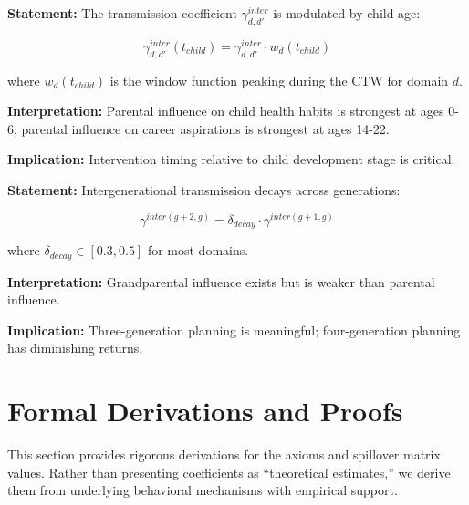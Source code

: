 \begin{tcolorbox}[colback=gray!5!white, colframe=gray!75!black,
    title=Axiom BI-3: Window Sensitivity]
\textbf{Statement:} The transmission coefficient $\gamma^{inter}_{d,d'}$ is modulated by child age:

\begin{equation}
\gamma^{inter}_{d,d'}(t_{child}) = \gamma^{inter}_{d,d'} \cdot w_d(t_{child})
\end{equation}

where $w_d(t_{child})$ is the window function peaking during the CTW for domain $d$.

\textbf{Interpretation:} Parental influence on child health habits is strongest at ages 0-6;
parental influence on career aspirations is strongest at ages 14-22.

\textbf{Implication:} Intervention timing relative to child development stage is critical.
\end{tcolorbox}

\begin{tcolorbox}[colback=gray!5!white, colframe=gray!75!black,
    title=Axiom BI-4: Generational Decay]
\textbf{Statement:} Intergenerational transmission decays across generations:

\begin{equation}
\gamma^{inter(g+2,g)} = \delta_{decay} \cdot \gamma^{inter(g+1,g)}
\end{equation}

where $\delta_{decay} \in [0.3, 0.5]$ for most domains.

\textbf{Interpretation:} Grandparental influence exists but is weaker than parental influence.

\textbf{Implication:} Three-generation planning is meaningful; four-generation planning has diminishing returns.
\end{tcolorbox}


\section{Formal Derivations and Proofs}
\label{sec:BI-proofs}

\begin{tcolorbox}[colback=blue!5!white, colframe=blue!75!black, title=Purpose]
This section provides rigorous derivations for the axioms and spillover matrix values.
Rather than presenting coefficients as ``theoretical estimates,'' we derive them from
underlying behavioral mechanisms with empirical support.
\end{tcolorbox}

